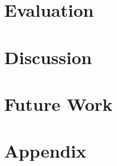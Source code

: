 \documentclass[sigconf,nonacm]{acmart}
\begin{document}
\section{Evaluation}

\label{sec:evaluation}

\section{Discussion}

\label{sec:discussion}

\section{Future Work}

\label{sec:future_work}





\clearpage
\section{Appendix}

\label{sec:appendix}
\end{document}
